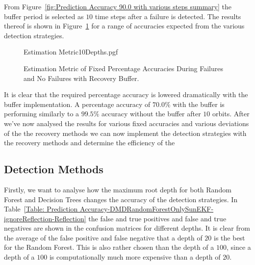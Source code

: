 \documentclass[letterpaper, 10 pt, conference]{ieeeconf}  %
\begin{document}
From Figure~\ref{fig:Prediction Accuracy 90.0 with various steps summary} the buffer period is selected as $10$ time steps after a failure is detected. The results thereof is shown in Figure~\ref{fig:Estimation Accuracy EKF-ignore with Recovery Buffer} for a range of accuracies expected from the various detection strategies. 

\begin{figure}[!htb]
	\begin{center}
		{Estimation Metric10Depths.pgf}
	\end{center}
	\caption[Estimation Metric of Fixed Percentage Accuracies During Failures and No Failures with Recovery Buffer]{Estimation Metric of Fixed Percentage Accuracies During Failures and No Failures with Recovery Buffer.}
	\label{fig:Estimation Accuracy EKF-ignore with Recovery Buffer}
\end{figure}

It is clear that the required percentage accuracy is lowered dramatically with the buffer implementation. A percentage accuracy of $70.0\%$ with the buffer is performing similarly to a $99.5\%$ accuracy without the buffer after $10$ orbits. After we've now analysed the results for various fixed accuracies and various deviations of the the recovery methods we can now implement the detection strategies with the recovery methods and determine the efficiency of the 

\subsection{Detection Methods}
Firstly, we want to analyse how the maximum root depth for both Random Forest and Decision Trees changes the accuracy of the detection strategies. In Table~\ref{Table: Prediction Accuracy-DMDRandomForestOnlySunEKF-ignoreReflection-Reflection} the false and true positives and false and true negatives are shown in the confusion matrices for different depths. It is clear from the average of the false positive and false negative that a depth of $20$ is the best for the Random Forest. This is also rather chosen than the depth of a $100$, since a depth of a $100$ is computationally much more expensive than a depth of $20$.
\end{document}
